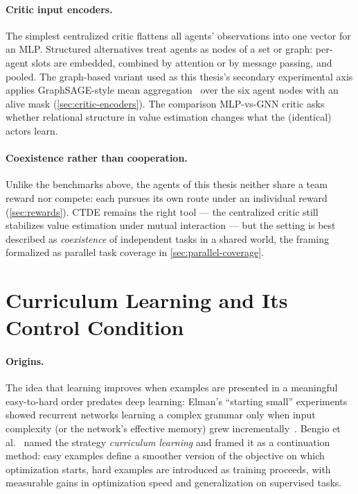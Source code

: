 \paragraph{Critic input encoders.}
The simplest centralized critic flattens all agents' observations into
one vector for an MLP. Structured alternatives treat agents as nodes of
a set or graph: per-agent slots are embedded, combined by attention or
by message passing, and pooled. The graph-based variant used as this
thesis's secondary experimental axis applies GraphSAGE-style mean
aggregation~\cite{hamilton2017graphsage} over the six agent nodes with
an alive mask (\cref{sec:critic-encoders}). The comparison MLP-vs-GNN
critic asks whether relational structure in value estimation changes
what the (identical) actors learn.

\paragraph{Coexistence rather than cooperation.}
Unlike the benchmarks above, the agents of this thesis neither share a
team reward nor compete: each pursues its own route under an individual
reward (\cref{sec:rewards}). CTDE remains the right tool --- the
centralized critic still stabilizes value estimation under mutual
interaction --- but the setting is best described as \emph{coexistence}
of independent tasks in a shared world, the framing formalized as
parallel task coverage in \cref{sec:parallel-coverage}.

\section{Curriculum Learning and Its Control Condition}
\label{sec:curriculum-bg}

\paragraph{Origins.}
The idea that learning improves when examples are presented in a
meaningful easy-to-hard order predates deep learning: Elman's
``starting small'' experiments showed recurrent networks learning a
complex grammar only when input complexity (or the network's effective
memory) grew incrementally~\cite{elman1993starting}. Bengio et
al.~\cite{bengio2009curriculum} named the strategy \emph{curriculum
learning} and framed it as a continuation method: easy examples define a
smoother version of the objective on which optimization starts, hard
examples are introduced as training proceeds, with measurable gains in
optimization speed and generalization on supervised tasks.

